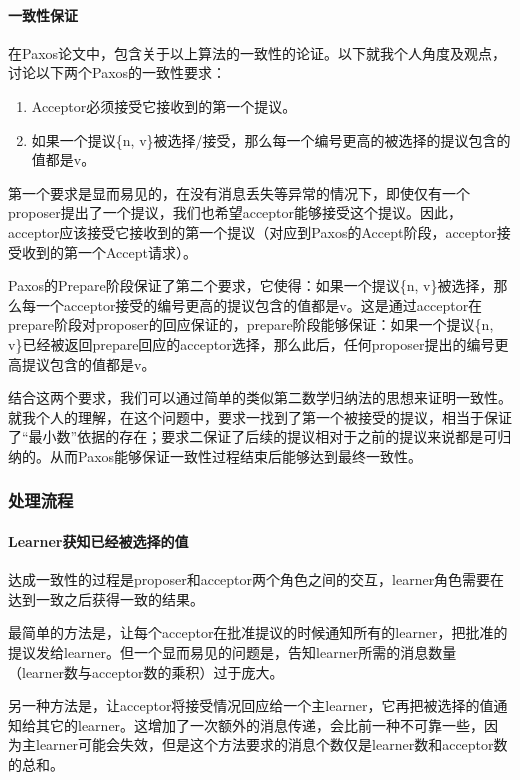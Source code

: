 \documentclass[UTF8]{article}
\begin{document}
\paragraph{一致性保证}

在Paxos论文中，包含关于以上算法的一致性的论证。以下就我个人角度及观点，讨论以下两个Paxos的一致性要求：

\begin{enumerate}
	\item Acceptor必须接受它接收到的第一个提议。
	\item 如果一个提议\{n, v\}被选择/接受，那么每一个编号更高的被选择的提议包含的值都是v。
\end{enumerate}

第一个要求是显而易见的，在没有消息丢失等异常的情况下，即使仅有一个proposer提出了一个提议，我们也希望acceptor能够接受这个提议。因此，acceptor应该接受它接收到的第一个提议（对应到Paxos的Accept阶段，acceptor接受收到的第一个Accept请求）。

Paxos的Prepare阶段保证了第二个要求，它使得：如果一个提议\{n, v\}被选择，那么每一个acceptor接受的编号更高的提议包含的值都是v。这是通过acceptor在prepare阶段对proposer的回应保证的，prepare阶段能够保证：如果一个提议\{n, v\}已经被返回prepare回应的acceptor选择，那么此后，任何proposer提出的编号更高提议包含的值都是v。

结合这两个要求，我们可以通过简单的类似第二数学归纳法的思想来证明一致性。就我个人的理解，在这个问题中，要求一找到了第一个被接受的提议，相当于保证了“最小数”依据的存在；要求二保证了后续的提议相对于之前的提议来说都是可归纳的。从而Paxos能够保证一致性过程结束后能够达到最终一致性。

\subsubsection{处理流程}

\paragraph{Learner获知已经被选择的值}

达成一致性的过程是proposer和acceptor两个角色之间的交互，learner角色需要在达到一致之后获得一致的结果。

最简单的方法是，让每个acceptor在批准提议的时候通知所有的learner，把批准的提议发给learner。但一个显而易见的问题是，告知learner所需的消息数量（learner数与acceptor数的乘积）过于庞大。

另一种方法是，让acceptor将接受情况回应给一个主learner，它再把被选择的值通知给其它的learner。这增加了一次额外的消息传递，会比前一种不可靠一些，因为主learner可能会失效，但是这个方法要求的消息个数仅是learner数和acceptor数的总和。
\end{document}
